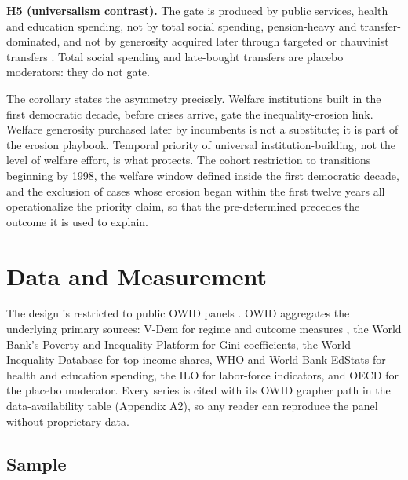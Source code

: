 \documentclass[11pt,letterpaper]{article}
\begin{document}
\textbf{H5 (universalism contrast).} The gate is produced by public services, health and education spending, not by total social spending, pension-heavy and transfer-dominated, and not by generosity acquired later through targeted or chauvinist transfers \citep{SzikraOktem2023, LendvaiBainton2021, Vanhuysse2006, Benczes2024, EnnserJedenastik2018}. Total social spending and late-bought transfers are placebo moderators: they do not gate.

The corollary states the asymmetry precisely. Welfare institutions built in the first democratic decade, before crises arrive, gate the inequality-erosion link. Welfare generosity purchased later by incumbents is not a substitute; it is part of the erosion playbook. Temporal priority of universal institution-building, not the level of welfare effort, is what protects. The cohort restriction to transitions beginning by 1998, the welfare window defined inside the first democratic decade, and the exclusion of cases whose erosion began within the first twelve years all operationalize the priority claim, so that the pre-determined precedes the outcome it is used to explain.

\section{Data and Measurement}

The design is restricted to public OWID panels \citep{OurWorldInData2025}. OWID aggregates the underlying primary sources: V-Dem for regime and outcome measures \citep{LuhrmannTannenberg2018, Coppedge2024}, the World Bank's Poverty and Inequality Platform for Gini coefficients, the World Inequality Database for top-income shares, WHO and World Bank EdStats for health and education spending, the ILO for labor-force indicators, and OECD for the placebo moderator. Every series is cited with its OWID grapher path in the data-availability table (Appendix A2), so any reader can reproduce the panel without proprietary data.

\subsection{Sample}
\end{document}
